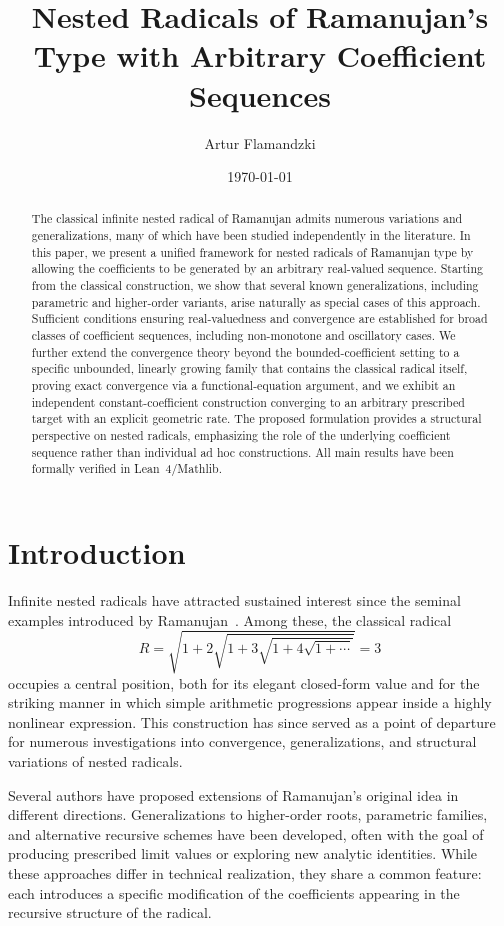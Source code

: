 \documentclass[11pt,a4paper]{amsart}
\title{Nested Radicals of {Ramanujan}'s Type with Arbitrary Coefficient Sequences}
\author{Artur Flamandzki}
\date{\today}
\theoremstyle{plain}
\theoremstyle{definition}
\theoremstyle{remark}
\begin{document}
\begin{abstract}
The classical infinite nested radical of Ramanujan admits numerous variations and generalizations, many of which have been studied independently in the literature. In this paper, we present a unified framework for nested radicals of Ramanujan type by allowing the coefficients to be generated by an arbitrary real-valued sequence. Starting from the classical construction, we show that several known generalizations, including parametric and higher-order variants, arise naturally as special cases of this approach. Sufficient conditions ensuring real-valuedness and convergence are established for broad classes of coefficient sequences, including non-monotone and oscillatory cases. We further extend the convergence theory beyond the bounded-coefficient setting to a specific unbounded, linearly growing family that contains the classical radical itself, proving exact convergence via a functional-equation argument, and we exhibit an independent constant-coefficient construction converging to an arbitrary prescribed target with an explicit geometric rate. The proposed formulation provides a structural perspective on nested radicals, emphasizing the role of the underlying coefficient sequence rather than individual ad hoc constructions. All main results have been formally verified in Lean~4/Mathlib.
\end{abstract}

\maketitle

\section{Introduction}

Infinite nested radicals have attracted sustained interest since the seminal examples introduced by Ramanujan~\cite{RamanujanNotebooks}. Among these, the classical radical
\[
R = \sqrt{1 + 2\sqrt{1 + 3\sqrt{1 + 4\sqrt{1 + \cdots}}}} = 3
\]
occupies a central position, both for its elegant closed-form value and for the striking manner in which simple arithmetic progressions appear inside a highly nonlinear expression. This construction has since served as a point of departure for numerous investigations into convergence, generalizations, and structural variations of nested radicals.

Several authors have proposed extensions of Ramanujan’s original idea in different directions. Generalizations to higher-order roots, parametric families, and alternative recursive schemes have been developed, often with the goal of producing prescribed limit values or exploring new analytic identities. While these approaches differ in technical realization, they share a common feature: each introduces a specific modification of the coefficients appearing in the recursive structure of the radical.
\end{document}
